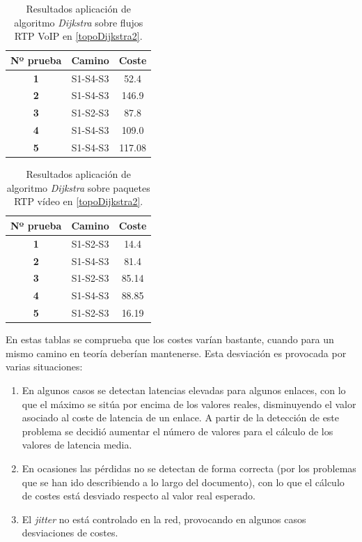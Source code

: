 \documentclass[a4paper,11pt]{book}
\begin{document}
\begin{table}[tb]
\centering
\begin{tabular}{|c|c|c|}
\hline
{\bf Nº prueba} & {\bf Camino} & {\bf Coste} \\ \hline
{\bf 1}         & S1-S4-S3     & 52.4        \\ \hline
{\bf 2}         & S1-S4-S3     & 146.9       \\ \hline
{\bf 3}         & S1-S2-S3     & 87.8        \\ \hline
{\bf 4}         & S1-S4-S3     & 109.0       \\ \hline
{\bf 5}         & S1-S4-S3     & 117.08      \\ \hline
\end{tabular}
\caption{Resultados aplicación de algoritmo \textit{Dijkstra} sobre flujos \ac{RTP} \ac{VoIP} en \ref{topoDijkstra2}.}
\label{VoIP}
\end{table}

\begin{table}[tb]
\centering
\begin{tabular}{|c|c|c|}
\hline
{\bf Nº prueba} & {\bf Camino} & {\bf Coste} \\ \hline
{\bf 1}         & S1-S2-S3     & 14.4        \\ \hline
{\bf 2}         & S1-S4-S3     & 81.4        \\ \hline
{\bf 3}         & S1-S2-S3     & 85.14       \\ \hline
{\bf 4}         & S1-S4-S3     & 88.85       \\ \hline
{\bf 5}         & S1-S2-S3     & 16.19       \\ \hline
\end{tabular}
\caption{Resultados aplicación de algoritmo \textit{Dijkstra} sobre paquetes \ac{RTP} vídeo en \ref{topoDijkstra2}.}
\label{caminicos}
\end{table}

En estas tablas se comprueba que los costes varían bastante, cuando para un mismo camino en teoría deberían mantenerse. Esta desviación es provocada por varias situaciones:

\begin{enumerate}
\item En algunos casos se detectan latencias elevadas para algunos enlaces, con lo que el máximo se sitúa por encima de los valores reales, disminuyendo el valor asociado al coste de latencia de un enlace. A partir de la detección de este problema se decidió aumentar el número de valores para el cálculo de los valores de latencia media.
\item En ocasiones las pérdidas no se detectan de forma correcta (por los problemas que se han ido describiendo a lo largo del documento), con lo que el cálculo de costes está desviado respecto al valor real esperado.
\item El \textit{jitter} no está controlado en la red, provocando en algunos casos desviaciones de costes.
\end{enumerate}
\end{document}

